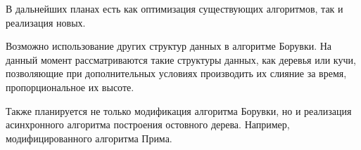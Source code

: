 \documentclass{article}
\begin{document}
В дальнейших планах есть как оптимизация существующих алгоритмов, так и реализация новых.


Возможно использование других  структур данных в алгоритме Борувки. 
На данный момент рассматриваются такие структуры данных, как деревья или кучи, позволяющие при дополнительных условиях производить их слияние за время, пропорциональное их высоте.

Также планируется не только модификация алгоритма Борувки, но и реализация асинхронного алгоритма построения остовного дерева. Например, модифицированного алгоритма Прима.

\newpage


\end{document}

